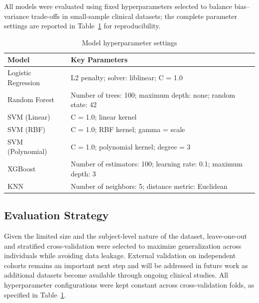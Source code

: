 All models were evaluated using fixed hyperparameters selected to balance bias–variance trade-offs in small-sample clinical datasets; the complete parameter 
settings are reported in Table~\ref{tab:hyperparameters} for reproducibility.
\begin{table}[H]
\centering
\caption{Model hyperparameter settings}
\footnotesize
\begin{tabularx}{\columnwidth}{l p{}}
\hline
\textbf{Model} & \textbf{Key Parameters} \\
\hline
Logistic Regression & L2 penalty; solver: liblinear; C = 1.0 \\
Random Forest & Number of trees: 100; maximum depth: none; random state: 42 \\
SVM (Linear) & C = 1.0; linear kernel \\
SVM (RBF) & C = 1.0; RBF kernel; gamma = scale \\
SVM (Polynomial) & C = 1.0; polynomial kernel; degree = 3 \\
XGBoost & Number of estimators: 100; learning rate: 0.1; maximum depth: 3 \\
KNN & Number of neighbors: 5; distance metric: Euclidean \\
\hline
\end{tabularx}
\label{tab:hyperparameters}
\end{table}


\subsection{Evaluation Strategy}
Given the limited size and the subject-level nature of the dataset, leave-one-out and stratified cross-validation were selected to maximize generalization across 
individuals while avoiding data leakage. External validation on independent cohorts remains an important next step and will be addressed in future work as additional 
datasets become available through ongoing clinical studies. All hyperparameter configurations were kept constant across cross-validation folds, as specified in 
Table~\ref{tab:hyperparameters}.


